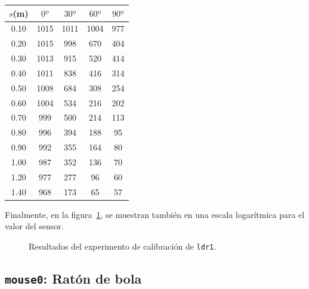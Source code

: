 \documentclass[10pt,a4paper,hidelinks,twocolumn]{article}
\begin{document}
\begin{center}
\begin{tabular}{ | c | c | c | c | c | }
\hline
$s$(m) & $0º$ & $30º$ & $60º$ & $90º$ \\ \hline
0.10 & 1015 & 1011 & 1004 & 977 \\ \hline
0.20 & 1015 & 998 & 670 & 404 \\ \hline
0.30 & 1013 & 915 & 520 & 414 \\ \hline
0.40 & 1011 & 838 & 416 & 314 \\ \hline
0.50 & 1008 & 684 & 308 & 254 \\ \hline
0.60 & 1004 & 534 & 216 & 202 \\ \hline
0.70 & 999 & 500 & 214 & 113 \\ \hline
0.80 & 996 & 394 & 188 & 95 \\ \hline
0.90 & 992 & 355 & 164 & 80 \\ \hline
1.00 & 987 & 352 & 136 & 70 \\ \hline
1.20 & 977 & 277 & 96 & 60 \\ \hline
1.40 & 968 & 173 & 65 & 57 \\ \hline
\end{tabular}
\end{center}

Finalmente, en la figura~\ref{fig:ldr1}, se muestran también en una escala 
logarítmica para el valor del sensor.

\begin{figure}[h]
\centering
{}
\caption{Resultados del experimento de calibración de 
\texttt{ldr1}.\label{fig:ldr1}}
\end{figure}

\subsection{\texttt{mouse0}: Ratón de bola}
\end{document}
